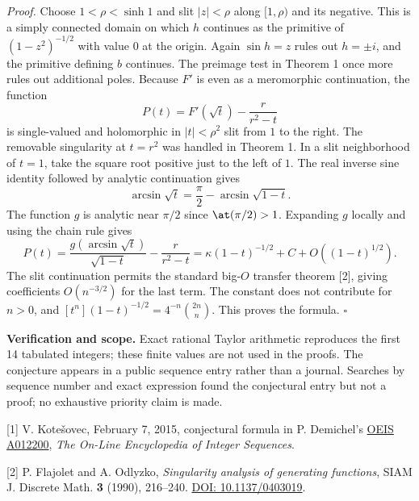 \documentclass[11pt,a4paper]{article}
\numberwithin{equation}{section}
\theoremstyle{definition}
\theoremstyle{remark}
\begin{document}
\textit{Proof.} Choose $1<\rho<\sinh1$ and slit $|z|<\rho$ along $[1,\rho)$ and its negative. This is a simply connected domain on which $h$ continues as the primitive of $(1-z^2)^{-1/2}$ with value $0$ at the origin. Again $\sin h=z$ rules out $h=\pm i$, and the primitive defining $b$ continues. The preimage test in Theorem 1 once more rules out additional poles. Because $F'$ is even as a meromorphic continuation, the function
\[
 P(t)=F'(\sqrt t)-\frac{r}{r^2-t}
\]
is single-valued and holomorphic in $|t|<\rho^2$ slit from $1$ to the right. The removable singularity at $t=r^2$ was handled in Theorem 1. In a slit neighborhood of $t=1$, take the square root positive just to the left of $1$. The real inverse sine identity followed by analytic continuation gives
\[
 \arcsin\sqrt{t}=\frac{\pi}{2}-\arcsin\sqrt{1-t}.
\]
The function $g$ is analytic near $\pi/2$ since $\at(\pi/2)>1$. Expanding $g$ locally and using the chain rule gives
\[
 P(t)=\frac{g(\arcsin\sqrt t)}{\sqrt{1-t}}-\frac{r}{r^2-t}
      =\kappa(1-t)^{-1/2}+C+O((1-t)^{1/2}).
\]
The slit continuation permits the standard big-$O$ transfer theorem [2], giving coefficients $O(n^{-3/2})$ for the last term. The constant does not contribute for $n>0$, and $[t^n](1-t)^{-1/2}=4^{-n}\binom{2n}{n}$. This proves the formula. \hfill$\square$

\textbf{Verification and scope.} Exact rational Taylor arithmetic reproduces the first 14 tabulated integers; these finite values are not used in the proofs. The conjecture appears in a public sequence entry rather than a journal. Searches by sequence number and exact expression found the conjectural entry but not a proof; no exhaustive priority claim is made.

{\small\raggedright
[1] V. Kote\v{s}ovec, February 7, 2015, conjectural formula in P. Demichel's
\href{https://oeis.org/A012200/internal}{OEIS A012200}, \emph{The On-Line Encyclopedia of Integer Sequences}.

[2] P. Flajolet and A. Odlyzko, \emph{Singularity analysis of generating functions}, SIAM J. Discrete Math. \textbf{3} (1990), 216--240.
\href{https://doi.org/10.1137/0403019}{DOI: 10.1137/0403019}.\par}

\par\endgroup

\begingroup
\newcommand{\E}{\mathbb E}
\newcommand{\Var}{\operatorname{Var}}
\end{document}
